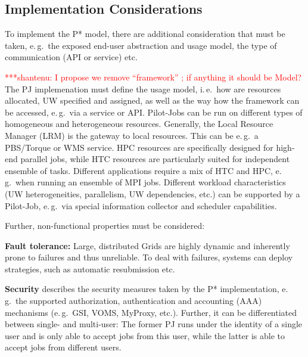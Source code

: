 \documentclass[conference,final]{IEEEtran}
\newcommand{\jhanote}[1]{ {\textcolor{red} { ***shantenu: #1 }}}
\newcommand{\jhanote}[1]{}
\begin{document}
\subsection{Implementation Considerations}

To implement the P* model, there are additional consideration that
must be taken, e.\,g.\ the exposed end-user abstraction and usage
model, the type of communication (API or service) etc.


\jhanote{I propose we remove ``framework'' ; if anything it should be
  Model?} The PJ implemenation must define the usage model, i.\,e.\ how are
resources allocated, UW specified and assigned, as well as the way how
the framework can be accessed, e.\,g.\ via a service or
API. Pilot-Jobs can be run on different types of homogeneous and
heterogeneous resources. Generally, the Local Resource Manager (LRM)
is the gateway to local resources. This can be e.\,g.\ a PBS/Torque or
WMS service. HPC resources are specifically designed for high-end
parallel jobs, while HTC resources are particularly suited for
independent ensemble of tasks. Different applications require a mix of
HTC and HPC, e.\,g.\ when running an ensemble of MPI jobs.  Different
workload characteristics (UW heterogeneities, parallelism, UW
dependencies, etc.) can be supported by a Pilot-Job, e.\,g.\ via
special information collector and scheduler capabilities.

Further, non-functional properties must be considered:
\begin{compactitem}
		\item \textbf{Fault tolerance:} Large, distributed Grids are highly dynamic 
		and inherently prone to failures and thus unreliable. To deal with failures, 
		systems can deploy strategies, such as automatic resubmission etc.
		\item \textbf{Security} describes the security measures taken by the P* 
		implementation, e.\,g.\ the supported authorization, authentication and 
		accounting (AAA) mechanisms (e.\,g.\   GSI, VOMS, MyProxy, etc.). 
		Further, it can be differentiated between single- and multi-user: The 
		former PJ runs under the identity of a single user and is only able to 
		accept jobs from this user, while the latter is able to accept jobs from 
	   different users.		
\end{compactitem}
\end{document}
